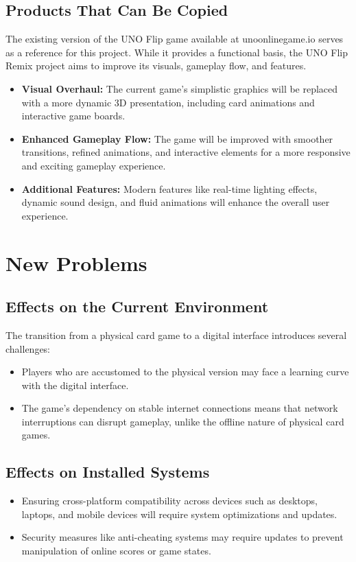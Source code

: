 \documentclass{article}
\begin{document}
\subsection{Products That Can Be Copied}
The existing version of the UNO Flip game available at unoonlinegame.io serves as a reference for this project. While it provides a functional basis, the UNO Flip Remix project aims to improve its visuals, gameplay flow, and features.
\begin{itemize}
    \item \textbf{Visual Overhaul:} The current game's simplistic graphics will be replaced with a more dynamic 3D presentation, including card animations and interactive game boards.
    \item \textbf{Enhanced Gameplay Flow:} The game will be improved with smoother transitions, refined animations, and interactive elements for a more responsive and exciting gameplay experience.
    \item \textbf{Additional Features:} Modern features like real-time lighting effects, dynamic sound design, and fluid animations will enhance the overall user experience.
\end{itemize}

\section{New Problems}

\subsection{Effects on the Current Environment}
The transition from a physical card game to a digital interface introduces several challenges:
\begin{itemize}
    \item Players who are accustomed to the physical version may face a learning curve with the digital interface.
    \item The game’s dependency on stable internet connections means that network interruptions can disrupt gameplay, unlike the offline nature of physical card games.
\end{itemize}

\subsection{Effects on Installed Systems}
\begin{itemize}
    \item Ensuring cross-platform compatibility across devices such as desktops, laptops, and mobile devices will require system optimizations and updates.
    \item Security measures like anti-cheating systems may require updates to prevent manipulation of online scores or game states.
\end{itemize}
\end{document}

